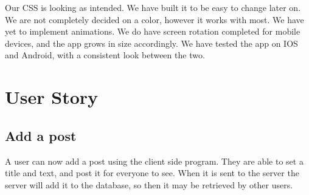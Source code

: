 \documentclass[12pt]{article}
\begin{document}
Our CSS is looking as intended. We have built it to be easy to change later on.
We are not completely decided on a color, however it works with most. We have
yet to implement animations. We do have screen rotation completed for mobile
devices, and the app grows in size accordingly. We have tested the app on IOS
and Android, with a consistent look between the two.

\section{User Story}

\subsection{Add a post}

A user can now add a post using the client side program.  They are able to set a title and text, and post it for everyone to see.  When it is sent to the server the server will add it to the database, so then it may be retrieved by other users.
\end{document}
